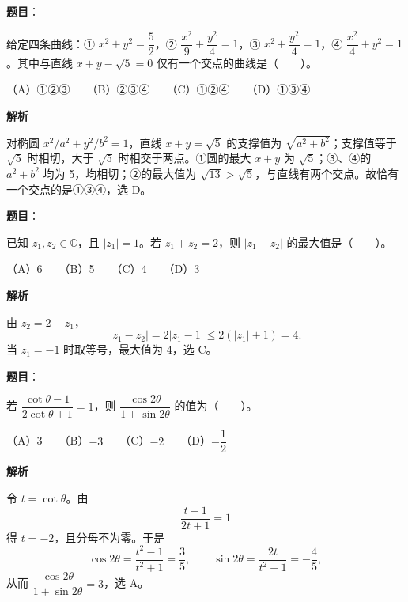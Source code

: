 \begin{answer}

\textbf{题目}：

给定四条曲线：① \(x^2+y^2=\dfrac52\)，② \(\dfrac{x^2}{9}+\dfrac{y^2}{4}=1\)，③ \(x^2+\dfrac{y^2}{4}=1\)，④ \(\dfrac{x^2}{4}+y^2=1\)。其中与直线 \(x+y-\sqrt5=0\) 仅有一个交点的曲线是\mbox{（　　）}。

（A）①②③　　（B）②③④　　（C）①②④　　（D）①③④

\textbf{解析}

对椭圆 \(x^2/a^2+y^2/b^2=1\)，直线 \(x+y=\sqrt5\) 的支撑值为 \(\sqrt{a^2+b^2}\)；支撑值等于 \(\sqrt5\) 时相切，大于 \(\sqrt5\) 时相交于两点。①圆的最大 \(x+y\) 为 \(\sqrt5\)；③、④的 \(a^2+b^2\) 均为 5，均相切；②的最大值为 \(\sqrt{13}>\sqrt5\)，与直线有两个交点。故恰有一个交点的是①③④，选 D。


\end{answer}
\begin{answer}

\textbf{题目}：

已知 \(z_1,z_2\in\mathbb C\)，且 \(|z_1|=1\)。若 \(z_1+z_2=2\)，则 \(|z_1-z_2|\) 的最大值是\mbox{（　　）}。

（A）6　　（B）5　　（C）4　　（D）3

\textbf{解析}

由 \(z_2=2-z_1\)，
\nopagebreak[4]
\[
|z_1-z_2|=2|z_1-1|\leqslant2(|z_1|+1)=4.
\]
当 \(z_1=-1\) 时取等号，最大值为 4，选 C。


\end{answer}
\begin{answer}

\textbf{题目}：

若 \(\dfrac{\cot\theta-1}{2\cot\theta+1}=1\)，则 \(\dfrac{\cos2\theta}{1+\sin2\theta}\) 的值为\mbox{（　　）}。

（A）3　　（B）\(-3\)　　（C）\(-2\)　　（D）\(-\dfrac12\)

\textbf{解析}

令 \(t=\cot\theta\)。由
\nopagebreak[4]
\[
\frac{t-1}{2t+1}=1
\]
得 \(t=-2\)，且分母不为零。于是
\nopagebreak[4]
\[
\cos2\theta=\frac{t^2-1}{t^2+1}=\frac35,\qquad
\sin2\theta=\frac{2t}{t^2+1}=-\frac45,
\]
从而 \(\dfrac{\cos2\theta}{1+\sin2\theta}=3\)，选 A。


\end{answer}
